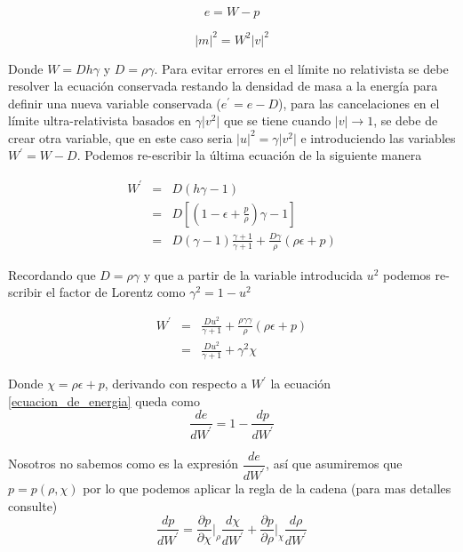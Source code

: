 \documentclass[12pt,a4paper]{book}
\providecommand{\abs}[1]{\lvert#1\rvert} %
\begin{document}
\begin{equation}\label{ecuacion_de_energia}
e=W-p
\end{equation}

\begin{equation}\label{modulos de los momentos}
\abs{m}^2= W^{2}\abs{v}^{2}
\end{equation}

Donde $W=D h \gamma$ y $D=\rho \gamma$. Para evitar errores en el límite no relativista se debe resolver la ecuación conservada restando la densidad de masa 
a la energía para definir una nueva variable conservada ($e^{'}=e-D$), para las cancelaciones en el límite ultra-relativista basados en $\gamma \abs{v^2}$ que se tiene cuando $\abs{v} \rightarrow 1$, se debe de crear otra variable, que en este caso seria $\abs{u}^2=\gamma \abs{v^2}$ e introduciendo las variables $W^{'}=W-D$. Podemos re-escribir la última ecuación de la siguiente manera

\begin{eqnarray*}
 W^{'}& = &D(h \gamma -1)\\
&=& D\left[ \left(1-\epsilon+ \frac{p}{\rho}\right) \gamma - 1 \right]\\
&=& D \left(\gamma-1 \right) \frac{\gamma+1}{\gamma+1}+\frac{D \gamma }{\rho}\left(\rho \epsilon + p \right)
\end{eqnarray*}

Recordando que $D=\rho \gamma$ y que a partir de la variable introducida $u^{2}$ podemos 
re-scribir el factor de Lorentz como $\gamma^{2} = 1- u^{2}$

\begin{eqnarray}\label{W_prima}
\nonumber W^{'}&=&\frac{D u^{2}}{\gamma + 1}
+\frac{\rho\gamma \gamma}{ \rho }\left(\rho \epsilon + p \right)\\
&=& \frac{D u^{2}}{\gamma + 1} + \gamma^{2} \chi
\end{eqnarray}

Donde $\chi=\rho \epsilon + p$, derivando con respecto a $W^{'}$ la ecuación \ref{ecuacion_de_energia} queda como
\begin{equation}\label{derivada_E_W}
\dfrac{de}{dW^{'}}=1-\dfrac{dp}{dW^{'}}
\end{equation}

Nosotros no sabemos como es la expresión $\dfrac{de}{dW^{'}}$, así que asumiremos que $p=p(\rho, \chi)$ por lo que podemos aplicar la regla de la cadena (para mas detalles consulte)
\begin{equation}\label{cadena}
\dfrac{dp}{dW^{'}}=\dfrac{\partial p}{\partial\chi}\Bigg |_{\rho} \dfrac{d\chi}{dW^{'}} + \dfrac{\partial p}{\partial \rho}\Big |_{\chi} \dfrac{d \rho}{d W^{'}}
\end{equation}
\end{document}
